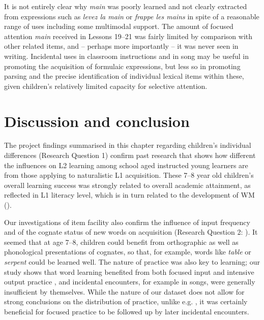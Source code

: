 \documentclass[output=paper]{langscibook}
\begin{document}
It is not entirely clear why \textit{main} was poorly learned and not clearly extracted from expressions such as \textit{levez la main} or \textit{frappe les mains} in spite of a reasonable range of uses including some multimodal support. The amount of focused attention \textit{main} received in Lessons 19--21 was fairly limited by comparison with other related items, and -- perhaps more importantly -- it was never seen in writing. Incidental uses in classroom instructions and in song may be useful in promoting the acquisition of formulaic expressions, but less so in promoting parsing and the precise identification of individual lexical items within these, given children’s relatively limited capacity for selective attention.

\section{Discussion and conclusion}

The project findings summarised in this chapter regarding children’s individual differences (Research Question 1) confirm past research that shows how different  the influences on L2 learning among school aged instructed young learners are from those applying to naturalistic L1 acquisition. These 7--8 year old children’s overall learning success was strongly related to overall academic attainment, as reflected in L1 literacy level, which is in turn related to the development of WM (\citealt{Sparks2012,CourtneyEtAl2017,KasprowiczEtAl2019}).

\begin{sloppypar}
Our investigations of item facility also confirm the influence of input frequency and of the cognate status of new words on acquisition (Research Question 2: \citealt{Szpotowicz2009,PetersWebb2018,DeWildeEtAl2021}). It seemed that at age 7--8, children could benefit from orthographic as well as phonological presentations of cognates, so that, for example, words like \textit{table} or \textit{serpent} could be learned well. The nature of practice was also key to learning; our study shows that word learning benefited from both focused input and intensive output practice \citep{DeKeyser2012}, and incidental encounters, for example in songs, were generally insufficient by themselves. While the nature of our dataset does not allow for strong conclusions on the distribution of practice, unlike e.g. \citet{KasprowiczEtAl2019}, it was certainly beneficial for focused practice to be followed up by later incidental encounters.
\end{sloppypar}
\end{document}
